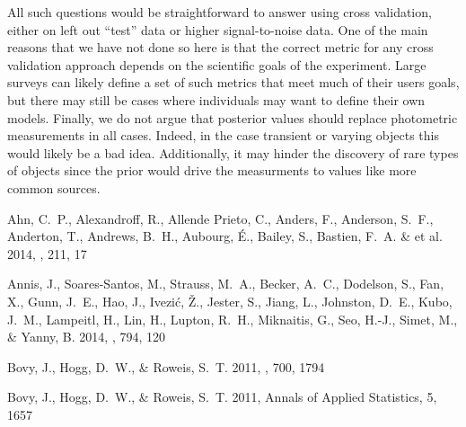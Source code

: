 \documentclass[12pt,preprint]{aastex}
\begin{document}
All such questions would be straightforward to answer using cross validation,
either on left out ``test'' data or higher signal-to-noise data.  One of the
main reasons that we have not done so here is that the correct metric for any
cross validation approach depends on the scientific goals of the experiment.  
Large surveys can likely define a set of such metrics that meet much of their 
users goals, but there may still be cases where individuals may want to define
their own models.  Finally, we do not argue that posterior values should 
replace photometric measurements in all cases.  Indeed, in the case transient
or varying objects this would likely be a bad idea.  Additionally, it may
hinder the discovery of rare types of objects since the prior would drive the
measurments to values like more common sources.

\clearpage


\begin{thebibliography}{1}

{{Ahn}, C.~P.,  {Alexandroff}, R.,  {Allende Prieto}, C.,  
  {Anders}, F.,  {Anderson}, S.~F.,  {Anderton}, T.,  {Andrews},
  B.~H.,  {Aubourg}, {\'E}.,  {Bailey}, S.,  {Bastien}, F.~A. \&  et al.}
  2014, \apj, 211, 17

{{Annis}, J.,  {Soares-Santos}, M.,  {Strauss}, M.~A.,  
  {Becker}, A.~C.,  {Dodelson}, S.,  {Fan}, X.,  {Gunn}, J.~E.,  
  {Hao}, J.,  {Ivezi{\'c}}, {\v Z}.,  {Jester}, S.,  {Jiang}, L.,  
  {Johnston}, D.~E.,  {Kubo}, J.~M.,  {Lampeitl}, H.,  {Lin}, H.,  
  {Lupton}, R.~H.,  {Miknaitis}, G.,  {Seo}, H.-J.,  {Simet}, M., \& 
  {Yanny}, B.} 2014, \apj, 794, 120

{Bovy}, J., {Hogg}, D.~W., \& {Roweis}, S.~T. 2011, \apj, 700, 1794

{Bovy}, J., {Hogg}, D.~W., \& {Roweis}, S.~T. 2011, Annals of Applied Statistics, 5, 1657

\end{thebibliography}
\end{document}
